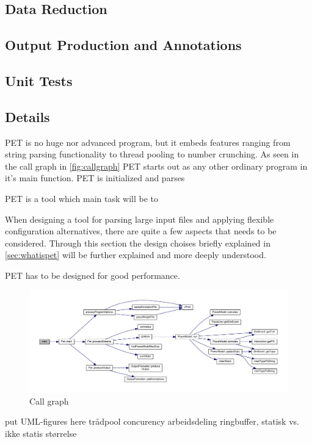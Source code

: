 \subsection{Data Reduction}

\subsection{Output Production and Annotations}

\subsection{Unit Tests}


\subsection{Details}

PET is no huge nor advanced program, but it embeds features ranging from string
parsing functionality to thread pooling to number crunching. As seen in the call graph
in \autoref{fig:callgraph} PET starts out as any other ordinary program in it's main
function. PET is initialized and parses 


PET is a tool which main task will be to 

When designing a tool for parsing large input files and applying flexible configuration alternatives,
there are quite a few aspects that needs to be considered. Through this section the design choises
briefly explained in \autoref{sec:whatispet} will be further explained and more deeply understood.

PET has to be designed for good performance.


\begin{figure}
%    
    \includegraphics[width=\textwidth]{figs/maincallgraph.pdf}
    \caption{Call graph}
    \label{fig:callgraph}
\end{figure}

put UML-figures here
trådpool
concurency
arbeidsdeling
ringbuffer, statisk vs. ikke statis størrelse




